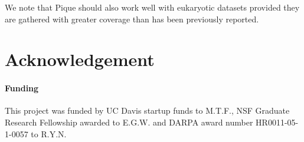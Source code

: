 \documentclass{bioinfo}
\begin{document}
We note that Pique should also work well with eukaryotic datasets
provided they are gathered with greater coverage than has been
previously reported.

\section*{Acknowledgement}
\paragraph{Funding\textcolon} 

This project was funded by UC Davis startup funds to M.T.F., NSF Graduate
Research Fellowship awarded to E.G.W. and DARPA award number
HR0011-05-1-0057 to R.Y.N.


%
%
%
%

%


\end{document}
